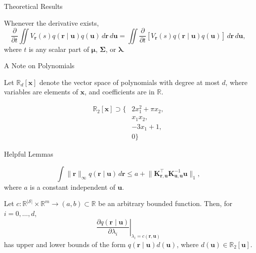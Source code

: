 \documentclass{beamer}
\newcommand{\Kuu}{\mathbf{K}_{\mathbf{u},\mathbf{u}}}
\newcommand{\Kru}{\mathbf{K}_{\mathbf{r},\mathbf{u}}}
\newcommand{\dt}{\frac{\partial}{\partial t}}
\newcommand{\dx}{\,d\mathbf{r}\,d\mathbf{u}}
\begin{document}
\begin{frame}{Theoretical Results}
  \begin{theorem} \label{thm:main}
    Whenever the derivative exists,
    \[
      \dt\iint
      V_{\mathbf{r}}(s)q(\mathbf{r} \mid \mathbf{u})q(\mathbf{u})\dx
      = \iint
      \dt[V_{\mathbf{r}}(s)q(\mathbf{r} \mid \mathbf{u})q(\mathbf{u})]\dx,
    \]
    where $t$ is any scalar part of $\bm\mu$, $\bm\Sigma$, or $\bm\lambda$.
  \end{theorem}
\end{frame}

\begin{frame}{A Note on Polynomials}
  \begin{definition}
    Let $\mathbb{R}_d[\mathbf{x}]$ denote the vector space of polynomials with
    degree at most $d$, where variables are elements of $\mathbf{x}$, and
    coefficients are in $\mathbb{R}$.
  \end{definition}
  \begin{example}
    \[
      \begin{split}
        \mathbb{R}_2[\mathbf{x}] \supset \{ &2x_1^2 + \pi x_2,\\
        &x_1x_2,\\
        &-3x_1 + 1,\\
        &0 \}
      \end{split}
    \]
  \end{example}
\end{frame}

\begin{frame}{Helpful Lemmas}
  \begin{lemma}
    \[
      \int \lVert \mathbf{r} \rVert_\infty q(\mathbf{r} \mid
      \mathbf{u})\,d\mathbf{r} \le a + \lVert \Kru^\intercal \Kuu^{-1}
      \mathbf{u} \rVert_1,
    \]
    where $a$ is a constant independent of $\mathbf{u}$.
  \end{lemma}
  \begin{lemma}
    Let $c : \mathbb{R}^{|\mathcal{S}|} \times \mathbb{R}^m \to (a, b) \subset
    \mathbb{R}$ be an arbitrary bounded function. Then, for $i = 0,
    \dots, d$,
    \[
      \left. \frac{\partial q(\mathbf{r} \mid \mathbf{u})}{\partial \lambda_i}
      \right|_{\lambda_i = c(\mathbf{r}, \mathbf{u})}
    \]
    has upper and lower bounds of the form $q(\mathbf{r} \mid
    \mathbf{u})d(\mathbf{u})$, where $d(\mathbf{u}) \in
    \mathbb{R}_2[\mathbf{u}]$.
  \end{lemma}
\end{frame}
\end{document}

